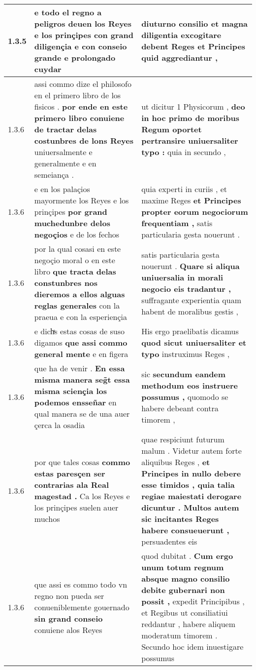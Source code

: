 \begin{tabular}{|p{1cm}|p{6.5cm}|p{6.5cm}|}
1.3.5 & e todo el regno a peligros deuen los Reyes \textbf{ e los prinçipes con grand diligençia } e con conseio grande e prolongado cuydar & diuturno consilio \textbf{ et magna diligentia excogitare debent Reges et Principes } quid aggrediantur , \\\hline
1.3.6 & assi commo dize el philosofo en el primero libro de los fisicos . \textbf{ por ende en este primero libro conuiene de tractar delas costunbres de lons Reyes } uniuersalmente e generalmente e en semeiança . & ut dicitur 1 Physicorum , \textbf{ deo in hoc primo de moribus Regum oportet pertransire uniuersaliter typo : } quia in secundo , \\\hline
1.3.6 & e en los palaçios mayormente los Reyes e los prinçipes \textbf{ por grand muchedunbre delos negoçios } e de los fechos & quia experti in curiis , et maxime Reges \textbf{ et Principes propter eorum negociorum frequentiam , } satis particularia gesta nouerunt . \\\hline
1.3.6 & por la qual cosasi en este negoçio moral o en este libro \textbf{ que tracta delas constunbres nos dieremos a ellos alguas reglas generales } con la praeua e con la esperiençia & satis particularia gesta nouerunt . \textbf{ Quare si aliqua uniuersalia in morali negocio eis tradantur , } suffragante experientia quam habent de moralibus gestis , \\\hline
1.3.6 & e dichͣs estas cosas de suso digamos \textbf{ que assi commo general mente } e en figera & His ergo praelibatis dicamus \textbf{ quod sicut uniuersaliter et typo } instruximus Reges , \\\hline
1.3.6 & que ha de venir . \textbf{ En essa misma manera seg̃t essa misma sciençia los podemos ensseñar } en qual manera se de una auer çerca la osadia & sic \textbf{ secundum eandem methodum eos instruere possumus , } quomodo se habere debeant contra timorem , \\\hline
1.3.6 & por que tales cosas \textbf{ commo estas paresçen ser contrarias ala Real magestad . } Ca los Reyes e los prinçipes suelen auer muchos & quae respiciunt futurum malum . Videtur autem forte aliquibus Reges , \textbf{ et Principes in nullo debere esse timidos , quia talia regiae maiestati derogare dicuntur . Multos autem sic incitantes Reges habere consueuerunt , } persuadentes eis \\\hline
1.3.6 & que assi es commo todo vn regno non pueda ser conueniblemente gouernado \textbf{ sin grand conseio } conuiene alos Reyes & quod dubitat . \textbf{ Cum ergo unum totum regnum absque magno consilio debite gubernari non possit , } expedit Principibus , et Regibus ut consiliatiui reddantur , habere aliquem moderatum timorem . Secundo hoc idem inuestigare possumus \\\hline

\end{tabular}
